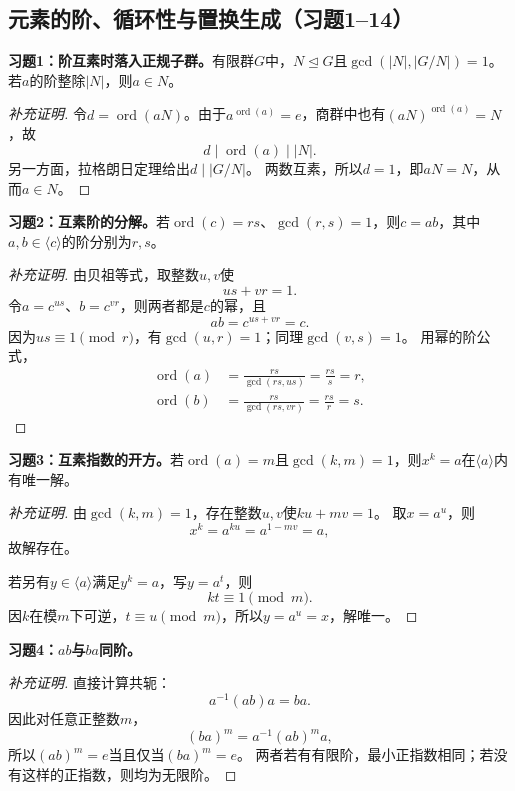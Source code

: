 

\subsection*{元素的阶、循环性与置换生成（习题1--14）}

\begin{problem}
\textbf{习题1：阶互素时落入正规子群。}有限群$G$中，$N\trianglelefteq G$且$\gcd(|N|,|G/N|)=1$。若$a$的阶整除$|N|$，则$a\in N$。
\end{problem}
\begin{proof}[补充证明]
令$d=\operatorname{ord}(aN)$。由于$a^{\operatorname{ord}(a)}=e$，商群中也有$(aN)^{\operatorname{ord}(a)}=N$，故
\[
d\mid\operatorname{ord}(a)\mid|N|.
\]
另一方面，拉格朗日定理给出$d\mid|G/N|$。
两数互素，所以$d=1$，即$aN=N$，从而$a\in N$。
\end{proof}

\begin{problem}
\textbf{习题2：互素阶的分解。}若$\operatorname{ord}(c)=rs$、$\gcd(r,s)=1$，则$c=ab$，其中$a,b\in\langle c\rangle$的阶分别为$r,s$。
\end{problem}
\begin{proof}[补充证明]
由贝祖等式，取整数$u,v$使
\[
us+vr=1.
\]
令$a=c^{us}$、$b=c^{vr}$，则两者都是$c$的幂，且
\[
ab=c^{us+vr}=c.
\]
因为$us\equiv1\pmod r$，有$\gcd(u,r)=1$；同理$\gcd(v,s)=1$。
用幂的阶公式，
\begin{align*}
\operatorname{ord}(a)&=\frac{rs}{\gcd(rs,us)}=\frac{rs}{s}=r,\\
\operatorname{ord}(b)&=\frac{rs}{\gcd(rs,vr)}=\frac{rs}{r}=s.
\end{align*}
\end{proof}

\begin{problem}
\textbf{习题3：互素指数的开方。}若$\operatorname{ord}(a)=m$且$\gcd(k,m)=1$，则$x^k=a$在$\langle a\rangle$内有唯一解。
\end{problem}
\begin{proof}[补充证明]
由$\gcd(k,m)=1$，存在整数$u,v$使$ku+mv=1$。
取$x=a^u$，则
\[
x^k=a^{ku}=a^{1-mv}=a,
\]
故解存在。

若另有$y\in\langle a\rangle$满足$y^k=a$，写$y=a^t$，则
\[
kt\equiv1\pmod m.
\]
因$k$在模$m$下可逆，$t\equiv u\pmod m$，所以$y=a^u=x$，解唯一。
\end{proof}

\begin{problem}
\textbf{习题4：$ab$与$ba$同阶。}
\end{problem}
\begin{proof}[补充证明]
直接计算共轭：
\[
a^{-1}(ab)a=ba.
\]
因此对任意正整数$m$，
\[
(ba)^m=a^{-1}(ab)^m a,
\]
所以$(ab)^m=e$当且仅当$(ba)^m=e$。
两者若有有限阶，最小正指数相同；若没有这样的正指数，则均为无限阶。
\end{proof}

